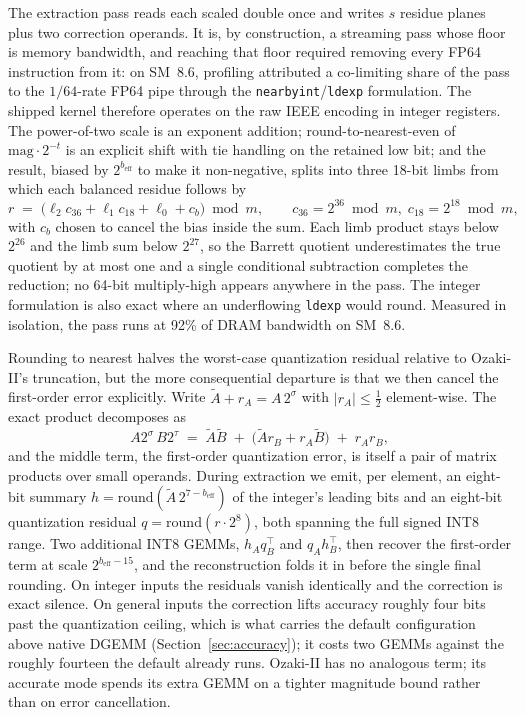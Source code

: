 \documentclass[11pt]{amsart}
\theoremstyle{plain}
\theoremstyle{definition}
\newcommand{\code}[1]{\texttt{#1}}
\begin{document}
The extraction pass reads each scaled double once and writes $s$ residue
planes plus two correction operands. It is, by construction, a streaming
pass whose floor is memory bandwidth, and reaching that floor required
removing every FP64 instruction from it: on SM~8.6, profiling attributed a
co-limiting share of the pass to the $1/64$-rate FP64 pipe through the
\code{nearbyint}/\code{ldexp} formulation. The shipped kernel therefore
operates on the raw IEEE encoding in integer registers. The power-of-two
scale is an exponent addition; round-to-nearest-even of
$\mathrm{mag} \cdot 2^{-t}$ is an explicit shift with tie handling on the
retained low bit; and the result, biased by $2^{b_{\mathrm{eff}}}$ to make
it non-negative, splits into three 18-bit limbs from which each balanced
residue follows by
\[
  r \;=\; \bigl(\ell_2 c_{36} + \ell_1 c_{18} + \ell_0 + c_b\bigr) \bmod m,
  \qquad c_{36} = 2^{36} \bmod m,\; c_{18} = 2^{18} \bmod m,
\]
with $c_b$ chosen to cancel the bias inside the sum. Each limb product
stays below $2^{26}$ and the limb sum below $2^{27}$, so the Barrett
quotient underestimates the true quotient by at most one and a single
conditional subtraction completes the reduction; no 64-bit multiply-high
appears anywhere in the pass. The integer formulation is also exact where an
underflowing \code{ldexp} would round. Measured in isolation, the pass
runs at 92\% of DRAM bandwidth on SM~8.6.

Rounding to nearest halves the worst-case quantization residual relative
to Ozaki-II's truncation, but the more consequential departure is that we
then cancel the first-order error explicitly. Write
$\tilde{A} + r_A = A \, 2^{\sigma}$ with $|r_A| \le \tfrac12$
element-wise. The exact product decomposes as
\[
  A 2^{\sigma} \, B 2^{\tau}
  \;=\; \tilde{A}\tilde{B}
  \;+\; \bigl(\tilde{A} r_B + r_A \tilde{B}\bigr)
  \;+\; r_A r_B ,
\]
and the middle term, the first-order quantization error, is itself a pair
of matrix products over small operands. During extraction we emit, per
element, an eight-bit summary $h = \mathrm{round}(\tilde{A} \,
2^{7-b_{\mathrm{eff}}})$ of the integer's leading bits and an eight-bit
quantization residual $q = \mathrm{round}(r \cdot 2^{8})$, both spanning
the full signed INT8 range. Two additional INT8 GEMMs, $h_A q_B^{\top}$
and $q_A h_B^{\top}$, then recover the first-order term at scale
$2^{b_{\mathrm{eff}} - 15}$, and the reconstruction folds it in before the
single final rounding. On integer inputs the residuals vanish identically
and the correction is exact silence. On general inputs the correction
lifts accuracy roughly four bits past the quantization ceiling, which is
what carries the default configuration above native DGEMM
(Section~\ref{sec:accuracy}); it costs two GEMMs against the roughly
fourteen the default already runs. Ozaki-II has no analogous term; its
accurate mode spends its extra GEMM on a tighter magnitude bound rather
than on error cancellation.
\end{document}
